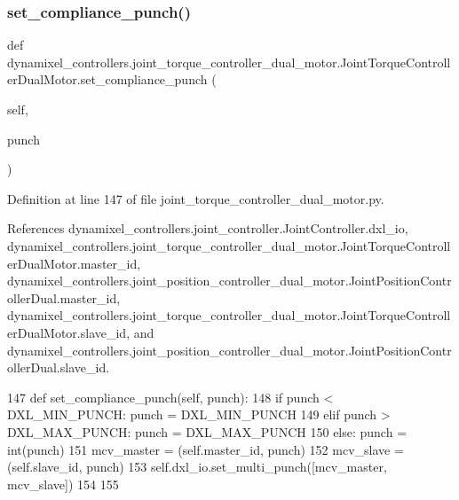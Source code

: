 \subsubsection{\texorpdfstring{set\+\_\+compliance\+\_\+punch()}{set\_compliance\_punch()}}
{\footnotesize\ttfamily def dynamixel\+\_\+controllers.\+joint\+\_\+torque\+\_\+controller\+\_\+dual\+\_\+motor.\+Joint\+Torque\+Controller\+Dual\+Motor.\+set\+\_\+compliance\+\_\+punch (\begin{DoxyParamCaption}\item[{}]{self,  }\item[{}]{punch }\end{DoxyParamCaption})}



Definition at line 147 of file joint\+\_\+torque\+\_\+controller\+\_\+dual\+\_\+motor.\+py.



References dynamixel\+\_\+controllers.\+joint\+\_\+controller.\+Joint\+Controller.\+dxl\+\_\+io, dynamixel\+\_\+controllers.\+joint\+\_\+torque\+\_\+controller\+\_\+dual\+\_\+motor.\+Joint\+Torque\+Controller\+Dual\+Motor.\+master\+\_\+id, dynamixel\+\_\+controllers.\+joint\+\_\+position\+\_\+controller\+\_\+dual\+\_\+motor.\+Joint\+Position\+Controller\+Dual.\+master\+\_\+id, dynamixel\+\_\+controllers.\+joint\+\_\+torque\+\_\+controller\+\_\+dual\+\_\+motor.\+Joint\+Torque\+Controller\+Dual\+Motor.\+slave\+\_\+id, and dynamixel\+\_\+controllers.\+joint\+\_\+position\+\_\+controller\+\_\+dual\+\_\+motor.\+Joint\+Position\+Controller\+Dual.\+slave\+\_\+id.


\begin{DoxyCode}
147     \textcolor{keyword}{def }set\_compliance\_punch(self, punch):
148         \textcolor{keywordflow}{if} punch < DXL\_MIN\_PUNCH: punch = DXL\_MIN\_PUNCH
149         \textcolor{keywordflow}{elif} punch > DXL\_MAX\_PUNCH: punch = DXL\_MAX\_PUNCH
150         \textcolor{keywordflow}{else}: punch = int(punch)
151         mcv\_master = (self.master\_id, punch)
152         mcv\_slave = (self.slave\_id, punch)
153         self.dxl\_io.set\_multi\_punch([mcv\_master, mcv\_slave])
154 
155 
\end{DoxyCode}
\mbox{\label{classdynamixel__controllers_1_1joint__torque__controller__dual__motor_1_1_joint_torque_controller_dual_motor_a18b2be85f08efbfbb5896a70912c5d2e}} 
